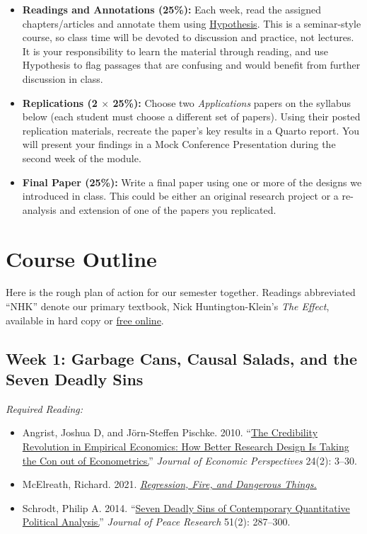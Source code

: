 \documentclass[11pt, letterpaper]{article}
\begin{document}
\begin{itemize}
	\item \textbf{Readings and Annotations (25\%):} Each week, read the assigned chapters/articles and annotate them using \href{https://hypothes.is/groups/Qm2VnAae/causal-inference}{Hypothesis}. This is a seminar-style course, so class time will be devoted to discussion and practice, not lectures. It is your responsibility to learn the material through reading, and use Hypothesis to flag passages that are confusing and would benefit from further discussion in class.
	\item \textbf{Replications (2 $\times$ 25\%):} Choose two \textit{Applications} papers on the syllabus below (each student must choose a different set of papers). Using their posted replication materials, recreate the paper's key results in a Quarto report. You will present your findings in a Mock Conference Presentation during the second week of the module.
	\item \textbf{Final Paper (25\%):} Write a final paper using one or more of the designs we introduced in class. This could be either an original research project or a re-analysis and extension of one of the papers you replicated.
\end{itemize}


\section*{Course Outline}

Here is the rough plan of action for our semester together. Readings abbreviated ``NHK'' denote our primary textbook, Nick Huntington-Klein's \textit{The Effect}, available in hard copy or \href{https://theeffectbook.net/}{free online}.

\subsection*{Week 1: Garbage Cans, Causal Salads, and the Seven Deadly Sins}

\textit{Required Reading:}

\begin{itemize}
	\item Angrist, Joshua D, and Jörn-Steffen Pischke. 2010. ``\href{https://pubs.aeaweb.org/doi/pdfplus/10.1257/jep.24.2.3}{The Credibility Revolution in Empirical Economics: How Better Research Design Is Taking the Con out of Econometrics.}'' \textit{Journal of Economic Perspectives} 24(2): 3–30.
	\item McElreath, Richard. 2021. \href{https://elevanth.org/blog/2021/06/15/regression-fire-and-dangerous-things-1-3/}{\textit{Regression, Fire, and Dangerous Things.}}
	\item Schrodt, Philip A. 2014. ``\href{https://journals.sagepub.com/doi/pdf/10.1177/0022343313499597}{Seven Deadly Sins of Contemporary Quantitative Political Analysis.}'' \textit{Journal of Peace Research} 51(2): 287–300.
\end{itemize}
\end{document}
